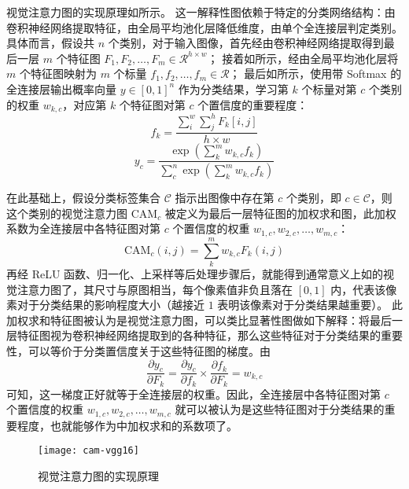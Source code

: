 \par
视觉注意力图的实现原理如所示。
这一解释性图依赖于特定的分类网络结构：由卷积神经网络提取特征，由全局平均池化层\cite{lin2013network}降低维度，由单个全连接层判定类别。
具体而言，假设共 $n$ 个类别，对于输入图像，首先经由卷积神经网络提取得到最后一层 $m$ 个特征图 $F_1, F_2, \dots, F_m \in \mathcal{R}^{h \times w}$；
接着如所示，经由全局平均池化层将 $m$ 个特征图映射为 $m$ 个标量 $f_1, f_2, \dots, f_m \in \mathcal{R}$；
最后如所示，使用带 Softmax 的全连接层输出概率向量 $y \in [0,1]^{n}$ 作为分类结果，学习第 $k$ 个标量对第 $c$ 个类别的权重 $w_{k,c}$，对应第 $k$ 个特征图对第 $c$ 个置信度的重要程度：
\begin{equation}
f_k = \frac{\sum_i^w \sum_j^h F_k[i,j]}{h \times w}
\label{eqn:gap}
\end{equation}
\begin{equation}
y_c = \frac{\exp(\sum_k^m w_{k,c} f_k)}{\sum_c^n \exp(\sum_k^m w_{k,c} f_k)}
\label{eqn:fc}
\end{equation}
\par
在此基础上，假设分类标签集合 $\mathcal{C}$ 指示出图像中存在第 $c$ 个类别，即 $c \in \mathcal{C}$，则这个类别的视觉注意力图 $\text{CAM}_c$ 被定义为最后一层特征图的加权求和图，此加权系数为全连接层中各特征图对第 $c$ 个置信度的权重 $w_{1,c}, w_{2,c}, \dots, w_{m,c}$：
\begin{equation}
\text{CAM}_c(i,j) = \sum_k^m w_{k,c} F_k(i,j)
\label{eqn:cam}
\end{equation}
再经 ReLU 函数、归一化、上采样等后处理步骤后，就能得到通常意义上如的视觉注意力图了，其尺寸与原图相当，每个像素值非负且落在 $[0,1]$ 内，代表该像素对于分类结果的影响程度大小（越接近 $1$ 表明该像素对于分类结果越重要）。
此加权求和特征图被认为是视觉注意力图，可以类比显著性图做如下解释：将最后一层特征图视为卷积神经网络提取到的各种特征，那么这些特征对于分类结果的重要性，可以等价于分类置信度关于这些特征图的梯度。由
\begin{equation}
\frac{\partial{y_c}}{\partial{F_k}} = \frac{\partial{y_c}}{\partial{f_k}} \times \frac{\partial{f_k}}{\partial{F_k}} = w_{k,c}
\end{equation}
可知，这一梯度正好就等于全连接层的权重。因此，全连接层中各特征图对第 $c$ 个置信度的权重 $w_{1,c}, w_{2,c}, \dots, w_{m,c}$ 就可以被认为是这些特征图对于分类结果的重要程度，也就能够作为中加权求和的系数项了。
\par
\begin{figure}[h]
\centering
\texttt{[image: cam-vgg16]}
\caption{视觉注意力图的实现原理}
\label{fig:cam-vgg16}
\end{figure}
